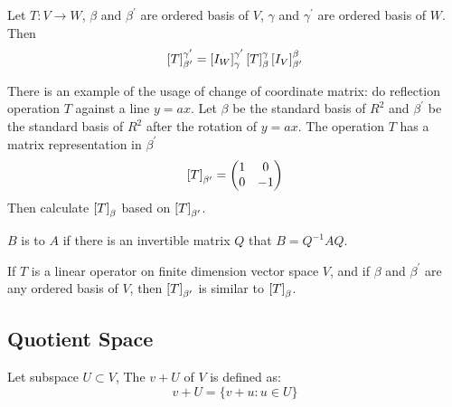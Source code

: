 \begin{theorem} \label{specialchangeofcoordinates}
	Let $T:V\rightarrow W$, $\beta$ and $\beta^\prime$ are ordered basis of $V$, $\gamma$ and $\gamma^\prime$ are ordered basis of $W$. Then
	\begin{equation}
		\coordinate{T}_{\beta^\prime}^{\gamma^\prime} = \coordinate{I_W}_\gamma^{\gamma^\prime} \coordinate{T}_\beta^\gamma \coordinate{I_V}_{\beta^\prime}^\beta
	\end{equation}
\end{theorem}


\begin{example}
There is an example of the usage of change of coordinate matrix: do reflection operation $T$ against a line $y = a x$. Let $\beta$ be the standard basis of $R^2$ and $\beta^\prime$ be the standard basis of $R^2$ after the rotation of $y = a x$. The operation $T$ has a matrix representation in $\beta^\prime$
	\begin{equation*}
		\coordinate{T}_{\beta^\prime} = \begin{pmatrix}
			1 & 0 \\
			0 & -1
		\end{pmatrix}		
	\end{equation*}
	Then calculate $\coordinate{T}_\beta$ based on $\coordinate{T}_{\beta^\prime}$.    
\end{example}

	



\begin{definition}
	$B$ is  to $A$ if there is an invertible matrix $Q$ that $B = Q^{-1} A Q$.
\end{definition}

\begin{theorem}
If $T$ is a linear operator on finite dimension vector space $V$, and if $\beta$ and $\beta^\prime$ are any ordered basis of $V$, then $\coordinate{T}_{\beta^\prime}$ is similar to $\coordinate{T}_\beta$.    
\end{theorem}




\subsection{Quotient Space}

\begin{definition}
    Let subspace $U \subset V$, The   $v + U$ of $V$ is defined as:
    \begin{equation}
        v + U = \{ v + u: u \in U\}
    \end{equation}    
\end{definition}

